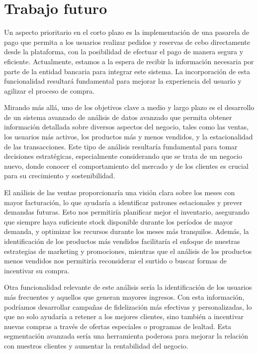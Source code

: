 \chapter{Trabajo futuro}\label{cap:cap7}

Un aspecto prioritario en el corto plazo es la implementación de una pasarela de pago que permita a los usuarios realizar pedidos y reservas de cebo directamente desde la plataforma, con la posibilidad de efectuar el pago de manera segura y eficiente. Actualmente, estamos a la espera de recibir la información necesaria por parte de la entidad bancaria para integrar este sistema. La incorporación de esta funcionalidad resultará fundamental para mejorar la experiencia del usuario y agilizar el proceso de compra.

\vspace{0.5cm}

Mirando más allá, uno de los objetivos clave a medio y largo plazo es el desarrollo de un sistema avanzado de análisis de datos avanzado que permita obtener información detallada sobre diversos aspectos del negocio, tales como las ventas, los usuarios más activos, los productos más y menos vendidos, y la estacionalidad de las transacciones. Este tipo de análisis resultaría fundamental para tomar decisiones estratégicas, especialmente considerando que se trata de un negocio nuevo, donde conocer el comportamiento del mercado y de los clientes es crucial para su crecimiento y sostenibilidad.

\vspace{0.5cm}

El análisis de las ventas proporcionaría una visión clara sobre los meses con mayor facturación, lo que ayudaría a identificar patrones estacionales y prever demandas futuras. Esto nos permitiría planificar mejor el inventario, asegurando que siempre haya suficiente stock disponible durante los períodos de mayor demanda, y optimizar los recursos durante los meses más tranquilos. Además, la identificación de los productos más vendidos facilitaría el enfoque de nuestras estrategias de marketing y promociones, mientras que el análisis de los productos menos vendidos nos permitiría reconsiderar el surtido o buscar formas de incentivar su compra.

\vspace{0.5cm}

Otra funcionalidad relevante de este análisis sería la identificación de los usuarios más frecuentes y aquellos que generan mayores ingresos. Con esta información, podríamos desarrollar campañas de fidelización más efectivas y personalizadas, lo que no solo ayudaría a retener a los mejores clientes, sino también a incentivar nuevas compras a través de ofertas especiales o programas de lealtad. Esta segmentación avanzada sería una herramienta poderosa para mejorar la relación con nuestros clientes y aumentar la rentabilidad del negocio.

